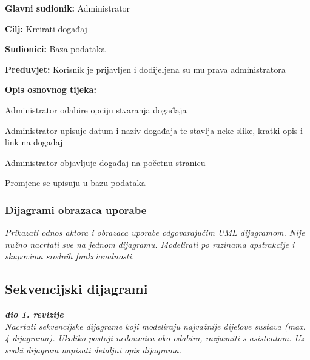 					
				\noindent {}
					\begin{packed_item}
	
						\item \textbf{Glavni sudionik: }Administrator
						\item  \textbf{Cilj:} Kreirati događaj
						\item  \textbf{Sudionici:} Baza podataka
						\item  \textbf{Preduvjet:} Korisnik je prijavljen i dodijeljena su mu prava administratora
						\item  \textbf{Opis osnovnog tijeka:}
						
						\item[] \begin{packed_enum}
	
							\item Administrator odabire opciju stvaranja događaja
							\item Administrator upisuje datum i naziv događaja te stavlja neke slike, kratki opis i link na događaj
							\item Administrator objavljuje događaj na početnu stranicu
							\item Promjene se upisuju u bazu podataka

						\end{packed_enum}	
					\end{packed_item}
					
				
					
				\subsubsection{Dijagrami obrazaca uporabe}
					
					\textit{Prikazati odnos aktora i obrazaca uporabe odgovarajućim UML dijagramom. Nije nužno nacrtati sve na jednom dijagramu. Modelirati po razinama apstrakcije i skupovima srodnih funkcionalnosti.}
				\eject		
				
			\subsection{Sekvencijski dijagrami}
				
				\textbf{\textit{dio 1. revizije}}\\
				
				\textit{Nacrtati sekvencijske dijagrame koji modeliraju najvažnije dijelove sustava (max. 4 dijagrama). Ukoliko postoji nedoumica oko odabira, razjasniti s asistentom. Uz svaki dijagram napisati detaljni opis dijagrama.}
				\eject
	
